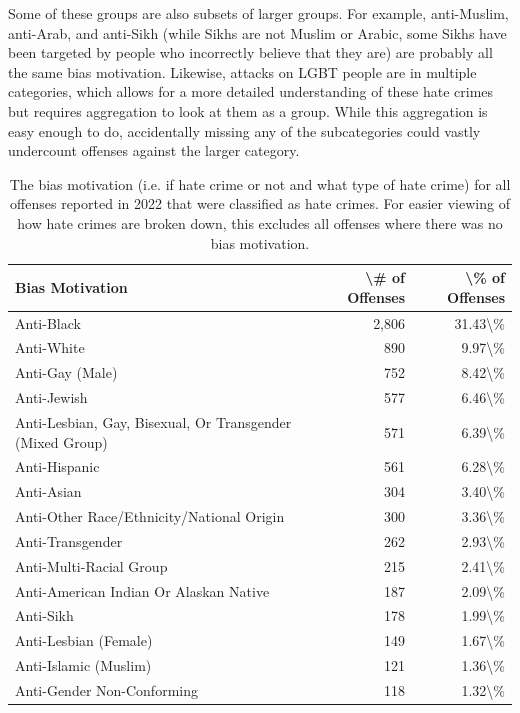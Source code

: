 \documentclass[
  12pt,
  openany]{book}
\begin{document}
Some of these groups are also subsets of larger groups. For example, anti-Muslim, anti-Arab, and anti-Sikh (while Sikhs are not Muslim or Arabic, some Sikhs have been targeted by people who incorrectly believe that they are) are probably all the same bias motivation. Likewise, attacks on LGBT people are in multiple categories, which allows for a more detailed understanding of these hate crimes but requires aggregation to look at them as a group. While this aggregation is easy enough to do, accidentally missing any of the subcategories could vastly undercount offenses against the larger category.

\begin{longtable}[t]{lrr}
\caption{\label{tab:offenseBiasMotivationBiases}The bias motivation (i.e. if hate crime or not and what type of hate crime) for all offenses reported in 2022 that were classified as hate crimes. For easier viewing of how hate crimes are broken down, this excludes all offenses where there was no bias motivation.}\\
\toprule
Bias Motivation & \textbackslash{}\# of Offenses & \textbackslash{}\% of Offenses\\
\midrule
Anti-Black & 2,806 & 31.43\textbackslash{}\%\\
Anti-White & 890 & 9.97\textbackslash{}\%\\
Anti-Gay (Male) & 752 & 8.42\textbackslash{}\%\\
Anti-Jewish & 577 & 6.46\textbackslash{}\%\\
Anti-Lesbian, Gay, Bisexual, Or Transgender (Mixed Group) & 571 & 6.39\textbackslash{}\%\\
\addlinespace
Anti-Hispanic & 561 & 6.28\textbackslash{}\%\\
Anti-Asian & 304 & 3.40\textbackslash{}\%\\
Anti-Other Race/Ethnicity/National Origin & 300 & 3.36\textbackslash{}\%\\
Anti-Transgender & 262 & 2.93\textbackslash{}\%\\
Anti-Multi-Racial Group & 215 & 2.41\textbackslash{}\%\\
\addlinespace
Anti-American Indian Or Alaskan Native & 187 & 2.09\textbackslash{}\%\\
Anti-Sikh & 178 & 1.99\textbackslash{}\%\\
Anti-Lesbian (Female) & 149 & 1.67\textbackslash{}\%\\
Anti-Islamic (Muslim) & 121 & 1.36\textbackslash{}\%\\
Anti-Gender Non-Conforming & 118 & 1.32\textbackslash{}\%\\

\end{longtable}
\end{document}
